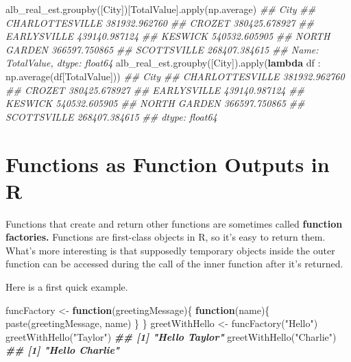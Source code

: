 \documentclass[
  12pt,
  krantz2]{krantz}
\makeatletter
\newenvironment{Shaded}{\begin{snugshade}}{\end{snugshade}}
\newcommand{\BuiltInTok}[1]{#1}
\newcommand{\CommentTok}[1]{\textcolor[rgb]{0.37,0.37,0.37}{\textit{#1}}}
\newcommand{\ControlFlowTok}[1]{\textcolor[rgb]{0.27,0.27,0.27}{\textbf{#1}}}
\newcommand{\DocumentationTok}[1]{\textcolor[rgb]{0.37,0.37,0.37}{\textbf{\textit{#1}}}}
\newcommand{\FunctionTok}[1]{\textcolor[rgb]{0,0,0}{#1}}
\newcommand{\KeywordTok}[1]{\textcolor[rgb]{0.27,0.27,0.27}{\textbf{#1}}}
\newcommand{\NormalTok}[1]{#1}
\newcommand{\OtherTok}[1]{\textcolor[rgb]{0.37,0.37,0.37}{#1}}
\newcommand{\StringTok}[1]{\textcolor[rgb]{0.5,0.5,0.5}{#1}}
\newenvironment{kframe}{%
\medskip{}
\setlength{\fboxsep}{.8em}
 \def\at@end@of@kframe{}%
 \ifinner\ifhmode%
  \def\at@end@of@kframe{\end{minipage}}%
  \begin{minipage}{\columnwidth}%
 \fi\fi%
 \def\FrameCommand##1{\hskip\@totalleftmargin \hskip-\fboxsep
 \colorbox{shadecolor}{##1}\hskip-\fboxsep
     \hskip-\linewidth \hskip-\@totalleftmargin \hskip\columnwidth}%
 \MakeFramed {\advance\hsize-\width
   \@totalleftmargin\z@ \linewidth\hsize
   \@setminipage}}%
 {\par\unskip\endMakeFramed%
 \at@end@of@kframe}
\renewenvironment{Shaded}{\begin{kframe}}{\end{kframe}}
\makeatother
\begin{document}
\begin{Shaded}
\begin{Highlighting}[]
\NormalTok{alb\_real\_est.groupby([}\StringTok{\textquotesingle{}City\textquotesingle{}}\NormalTok{])[}\StringTok{\textquotesingle{}TotalValue\textquotesingle{}}\NormalTok{].}\BuiltInTok{apply}\NormalTok{(np.average)}
\CommentTok{\#\# City}
\CommentTok{\#\# CHARLOTTESVILLE    381932.962760}
\CommentTok{\#\# CROZET             380425.678927}
\CommentTok{\#\# EARLYSVILLE        439140.987124}
\CommentTok{\#\# KESWICK            540532.605905}
\CommentTok{\#\# NORTH GARDEN       366597.750865}
\CommentTok{\#\# SCOTTSVILLE        268407.384615}
\CommentTok{\#\# Name: TotalValue, dtype: float64}
\NormalTok{alb\_real\_est.groupby([}\StringTok{\textquotesingle{}City\textquotesingle{}}\NormalTok{]).}\BuiltInTok{apply}\NormalTok{(}\KeywordTok{lambda}\NormalTok{ df : np.average(df[}\StringTok{\textquotesingle{}TotalValue\textquotesingle{}}\NormalTok{]))}
\CommentTok{\#\# City}
\CommentTok{\#\# CHARLOTTESVILLE    381932.962760}
\CommentTok{\#\# CROZET             380425.678927}
\CommentTok{\#\# EARLYSVILLE        439140.987124}
\CommentTok{\#\# KESWICK            540532.605905}
\CommentTok{\#\# NORTH GARDEN       366597.750865}
\CommentTok{\#\# SCOTTSVILLE        268407.384615}
\CommentTok{\#\# dtype: float64}
\end{Highlighting}
\end{Shaded}

\hypertarget{functions-as-function-outputs-in-r}{%
\section{Functions as Function Outputs in R}\label{functions-as-function-outputs-in-r}}

Functions that create and return other functions are sometimes called \textbf{function factories.} Functions are first-class objects in R, so it's easy to return them. What's more interesting is that supposedly temporary objects inside the outer function can be accessed during the call of the inner function after it's returned.

Here is a first quick example.

\begin{Shaded}
\begin{Highlighting}[]
\NormalTok{funcFactory }\OtherTok{\textless{}{-}} \ControlFlowTok{function}\NormalTok{(greetingMessage)\{}
  \ControlFlowTok{function}\NormalTok{(name)\{}
    \FunctionTok{paste}\NormalTok{(greetingMessage, name)}
\NormalTok{  \}}
\NormalTok{\}}
\NormalTok{greetWithHello }\OtherTok{\textless{}{-}} \FunctionTok{funcFactory}\NormalTok{(}\StringTok{"Hello"}\NormalTok{)}
\FunctionTok{greetWithHello}\NormalTok{(}\StringTok{"Taylor"}\NormalTok{)}
\DocumentationTok{\#\# [1] "Hello Taylor"}
\FunctionTok{greetWithHello}\NormalTok{(}\StringTok{"Charlie"}\NormalTok{)}
\DocumentationTok{\#\# [1] "Hello Charlie"}
\end{Highlighting}
\end{Shaded}
\end{document}
